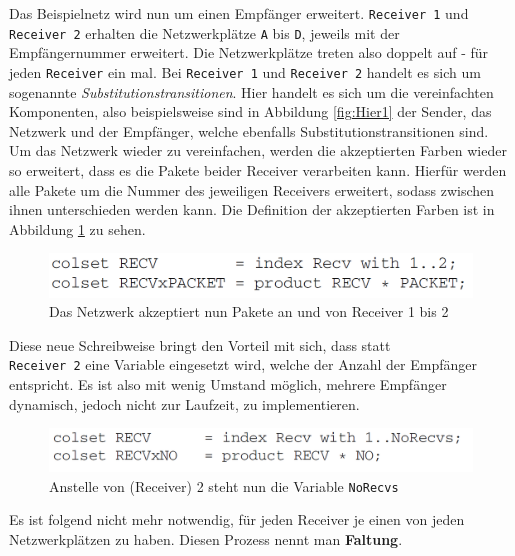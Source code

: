 \documentclass[11pt,onecolumn,a4paper,DIV=calc]{scrartcl}
\begin{document}
Das Beispielnetz wird nun um einen Empfänger erweitert. \texttt{Receiver 1} und \texttt{Receiver 2} erhalten die Netzwerkplätze \texttt{A} bis \texttt{D}, jeweils mit der Empfängernummer erweitert. Die Netzwerkplätze treten also doppelt auf - für jeden \texttt{Receiver} ein mal.
Bei \texttt{Receiver 1} und \texttt{Receiver 2} handelt es sich um sogenannte \textit{Substitutionstransitionen}. Hier handelt es sich um die vereinfachten Komponenten, also beispielsweise sind in Abbildung \ref{fig:Hier1} der Sender, das Netzwerk und der Empfänger, welche ebenfalls Substitutionstransitionen sind.\\
Um das Netzwerk wieder zu vereinfachen, werden die akzeptierten Farben wieder so erweitert, dass es die Pakete beider Receiver verarbeiten kann. Hierfür werden alle Pakete um die Nummer des jeweiligen Receivers erweitert, sodass zwischen ihnen unterschieden werden kann. Die Definition der akzeptierten Farben ist in Abbildung \ref{fig:para1} zu sehen.
\begin{figure}[H]
    \centering
    \includegraphics[scale=0.55]{para1.PNG}
    \caption{Das Netzwerk akzeptiert nun Pakete an und von Receiver 1 bis 2}
    \label{fig:para1}
\end{figure}
Diese neue Schreibweise bringt den Vorteil mit sich, dass statt\\ \texttt{Receiver 2} eine Variable eingesetzt wird, welche der Anzahl der Empfänger entspricht. Es ist also mit wenig Umstand möglich, mehrere Empfänger dynamisch, jedoch nicht zur Laufzeit, zu implementieren.

\begin{figure}[H]
    \centering
    \includegraphics[scale=0.53]{para2}
    \caption{Anstelle von (Receiver) 2 steht nun die Variable \texttt{NoRecvs}}
    \label{fig:para2}
\end{figure}

Es ist folgend nicht mehr notwendig, für jeden Receiver je einen von jeden Netzwerkplätzen zu haben. Diesen Prozess nennt man \textbf{Faltung}.
\end{document}
